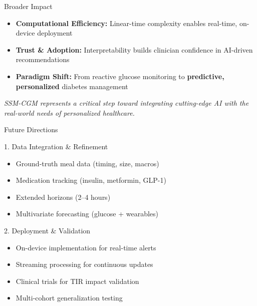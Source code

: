 \documentclass[aspectratio=169,xcolor=dvipsnames]{beamer}
\begin{document}
\begin{frame}
    \begin{block}{Broader Impact}
        \begin{itemize}
            \item \textbf{Computational Efficiency:} Linear-time complexity enables real-time, on-device deployment
            \item \textbf{Trust \& Adoption:} Interpretability builds clinician confidence in AI-driven recommendations
            \item \textbf{Paradigm Shift:} From reactive glucose monitoring to \textbf{predictive, personalized} diabetes management
        \end{itemize}
    \end{block}
    
    \vspace{0.5em}
    \begin{center}
        \textit{SSM-CGM represents a critical step toward integrating cutting-edge AI with the real-world needs of personalized healthcare.}
    \end{center}
\end{frame}

\begin{frame}{Future Directions}
    \begin{block}{1. Data Integration \& Refinement}
        \begin{itemize}
            \item Ground-truth meal data (timing, size, macros)
            \item Medication tracking (insulin, metformin, GLP-1)
            \item Extended horizons (2--4 hours)
            \item Multivariate forecasting (glucose + wearables)
        \end{itemize}
    \end{block}
    
    \begin{block}{2. Deployment \& Validation}
        \begin{itemize}
            \item On-device implementation for real-time alerts
            \item Streaming processing for continuous updates
            \item Clinical trials for TIR impact validation
            \item Multi-cohort generalization testing
        \end{itemize}
    \end{block}
\end{frame}
\end{document}

